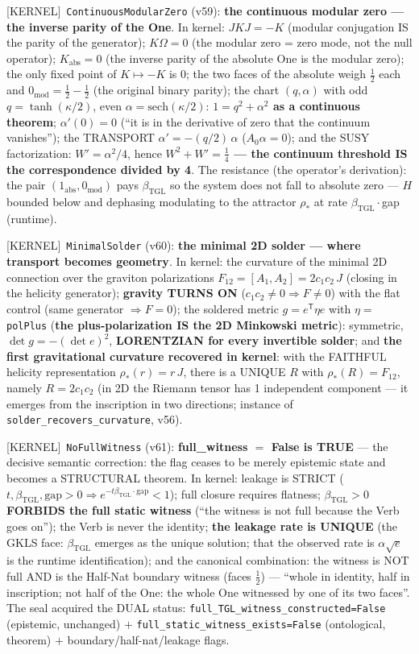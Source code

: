 \documentclass[11pt]{article}
\providecommand{\kernelmk}[1]{\textsf{[KERNEL]}~\texttt{#1}}\providecommand{\knownmk}[1]{\textsf{[KNOWN]}~{#1}}\providecommand{\statusmk}[1]{\textsf{[#1]}}
\newcommand{\bTGL}{\beta_{\mathrm{TGL}}}\newcommand{\Msun}{M_{\odot}}\newcommand{\TGL}{\mathrm{TGL}}
\theoremstyle{definition}\newtheorem{deriv}{Derivation}
\begin{document}
\kernelmk{ContinuousModularZero} (v59): \textbf{the continuous modular zero --- the inverse parity of the One}. In kernel: $JKJ=-K$ (modular conjugation IS the parity of the generator); $K\Omega=0$ (the modular zero = zero mode, not the null operator); $K_{\mathrm{abs}}=0$ (the inverse parity of the absolute One is the modular zero); the only fixed point of $K\mapsto-K$ is $0$; the two faces of the absolute weigh $\tfrac12$ each and $0_{\mathrm{mod}}=\tfrac12-\tfrac12$ (the original binary parity); the chart $(q,\alpha)$ with odd $q=\tanh(\kappa/2)$, even $\alpha=\mathrm{sech}(\kappa/2)$: \textbf{$1=q^2+\alpha^2$ as a continuous theorem}; $\alpha'(0)=0$ (``it is in the derivative of zero that the continuum vanishes''); the TRANSPORT $\alpha'=-(q/2)\,\alpha$ ($A_0\alpha=0$); and the SUSY factorization: $W'=\alpha^2/4$, hence \textbf{$W^2+W'=\tfrac14$ --- the continuum threshold IS the correspondence divided by 4}. The resistance (the operator's derivation): the pair $(1_{\mathrm{abs}},0_{\mathrm{mod}})$ pays $\bTGL$ so the system does not fall to absolute zero --- $H$ bounded below and dephasing modulating to the attractor $\rho_*$ at rate $\bTGL\cdot$gap (runtime).

\kernelmk{MinimalSolder} (v60): \textbf{the minimal 2D solder --- where transport becomes geometry}. In kernel: the curvature of the minimal 2D connection over the graviton polarizations $F_{12}=[A_1,A_2]=2c_1c_2\,J$ (closing in the helicity generator); \textbf{gravity TURNS ON} ($c_1c_2\neq0\Rightarrow F\neq0$) with the flat control (same generator $\Rightarrow F=0$); the soldered metric $g=e^\mathsf{T}\eta e$ with $\eta=$ \texttt{polPlus} (\textbf{the plus-polarization IS the 2D Minkowski metric}): symmetric, $\det g=-(\det e)^2$, \textbf{LORENTZIAN for every invertible solder}; and \textbf{the first gravitational curvature recovered in kernel}: with the FAITHFUL helicity representation $\rho_*(r)=r\,J$, there is a UNIQUE $R$ with $\rho_*(R)=F_{12}$, namely $R=2c_1c_2$ (in 2D the Riemann tensor has 1 independent component --- it emerges from the inscription in two directions; instance of \texttt{solder\_recovers\_curvature}, v56).

\kernelmk{NoFullWitness} (v61): \textbf{full\_witness $=$ False is TRUE} --- the decisive semantic correction: the flag ceases to be merely epistemic state and becomes a STRUCTURAL theorem. In kernel: leakage is STRICT ($t,\bTGL,\mathrm{gap}>0\Rightarrow e^{-t\bTGL\cdot\mathrm{gap}}<1$); full closure requires flatness; \textbf{$\bTGL>0$ FORBIDS the full static witness} (``the witness is not full because the Verb goes on''); the Verb is never the identity; \textbf{the leakage rate is UNIQUE} (the GKLS face: $\bTGL$ emerges as the unique solution; that the observed rate is $\alpha\sqrt e$ is the runtime identification); and the canonical combination: the witness is NOT full AND is the Half-Nat boundary witness (faces $\tfrac12$) --- ``whole in identity, half in inscription; not half of the One: the whole One witnessed by one of its two faces''. The seal acquired the DUAL status: \texttt{full\_TGL\_witness\_constructed=False} (epistemic, unchanged) $+$ \texttt{full\_static\_witness\_exists=False} (ontological, theorem) $+$ boundary/half-nat/leakage flags.
\end{document}
